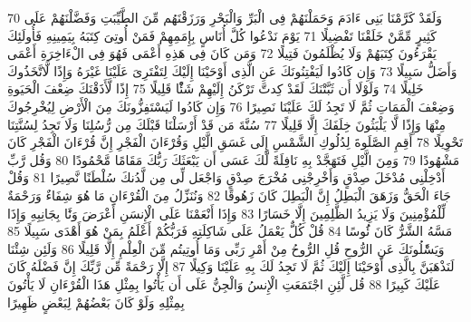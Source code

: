 \documentclass[20pt,a4paper]{article}
\begin{document}
{\tiny\colorbox{cl_aya}{70}} وَلَقَدْ كَرَّمْنَا بَنِى ءَادَمَ وَحَمَلْنَهُمْ فِى الْبَرِّ وَالْبَحْرِ وَرَزَقْنَهُم مِّنَ الطَّيِّبَتِ وَفَضَّلْنَهُمْ عَلَى كَثِيرٍ مِّمَّنْ خَلَقْنَا تَفْضِيلًا
{\tiny\colorbox{cl_aya}{71}} يَوْمَ نَدْعُوا كُلَّ أُنَاسٍ بِإِمَمِهِمْ فَمَنْ أُوتِىَ كِتَبَهُ بِيَمِينِهِ فَأُولَئِكَ يَقْرَءُونَ كِتَبَهُمْ وَلَا يُظْلَمُونَ فَتِيلًا
{\tiny\colorbox{cl_aya}{72}} وَمَن كَانَ فِى هَذِهِ أَعْمَى فَهُوَ فِى الْءَاخِرَةِ أَعْمَى وَأَضَلُّ سَبِيلًا
{\tiny\colorbox{cl_aya}{73}} وَإِن كَادُوا لَيَفْتِنُونَكَ عَنِ الَّذِى أَوْحَيْنَا إِلَيْكَ لِتَفْتَرِىَ عَلَيْنَا غَيْرَهُ وَإِذًا لَّاتَّخَذُوكَ خَلِيلًا
{\tiny\colorbox{cl_aya}{74}} وَلَوْلَا أَن ثَبَّتْنَكَ لَقَدْ كِدتَّ تَرْكَنُ إِلَيْهِمْ شَئًْا قَلِيلًا
{\tiny\colorbox{cl_aya}{75}} إِذًا لَّأَذَقْنَكَ ضِعْفَ الْحَيَوةِ وَضِعْفَ الْمَمَاتِ ثُمَّ لَا تَجِدُ لَكَ عَلَيْنَا نَصِيرًا
{\tiny\colorbox{cl_aya}{76}} وَإِن كَادُوا لَيَسْتَفِزُّونَكَ مِنَ الْأَرْضِ لِيُخْرِجُوكَ مِنْهَا وَإِذًا لَّا يَلْبَثُونَ خِلَفَكَ إِلَّا قَلِيلًا
{\tiny\colorbox{cl_aya}{77}} سُنَّةَ مَن قَدْ أَرْسَلْنَا قَبْلَكَ مِن رُّسُلِنَا وَلَا تَجِدُ لِسُنَّتِنَا تَحْوِيلًا
{\tiny\colorbox{cl_aya}{78}} أَقِمِ الصَّلَوةَ لِدُلُوكِ الشَّمْسِ إِلَى غَسَقِ الَّيْلِ وَقُرْءَانَ الْفَجْرِ إِنَّ قُرْءَانَ الْفَجْرِ كَانَ مَشْهُودًا
{\tiny\colorbox{cl_aya}{79}} وَمِنَ الَّيْلِ فَتَهَجَّدْ بِهِ نَافِلَةً لَّكَ عَسَى أَن يَبْعَثَكَ رَبُّكَ مَقَامًا مَّحْمُودًا
{\tiny\colorbox{cl_aya}{80}} وَقُل رَّبِّ أَدْخِلْنِى مُدْخَلَ صِدْقٍ وَأَخْرِجْنِى مُخْرَجَ صِدْقٍ وَاجْعَل لِّى مِن لَّدُنكَ سُلْطَنًا نَّصِيرًا
{\tiny\colorbox{cl_aya}{81}} وَقُلْ جَاءَ الْحَقُّ وَزَهَقَ الْبَطِلُ إِنَّ الْبَطِلَ كَانَ زَهُوقًا
{\tiny\colorbox{cl_aya}{82}} وَنُنَزِّلُ مِنَ الْقُرْءَانِ مَا هُوَ شِفَاءٌ وَرَحْمَةٌ لِّلْمُؤْمِنِينَ وَلَا يَزِيدُ الظَّلِمِينَ إِلَّا خَسَارًا
{\tiny\colorbox{cl_aya}{83}} وَإِذَا أَنْعَمْنَا عَلَى الْإِنسَنِ أَعْرَضَ وَنََٔا بِجَانِبِهِ وَإِذَا مَسَّهُ الشَّرُّ كَانَ ئَُوسًا
{\tiny\colorbox{cl_aya}{84}} قُلْ كُلٌّ يَعْمَلُ عَلَى شَاكِلَتِهِ فَرَبُّكُمْ أَعْلَمُ بِمَنْ هُوَ أَهْدَى سَبِيلًا
{\tiny\colorbox{cl_aya}{85}} وَيَسَْٔلُونَكَ عَنِ الرُّوحِ قُلِ الرُّوحُ مِنْ أَمْرِ رَبِّى وَمَا أُوتِيتُم مِّنَ الْعِلْمِ إِلَّا قَلِيلًا
{\tiny\colorbox{cl_aya}{86}} وَلَئِن شِئْنَا لَنَذْهَبَنَّ بِالَّذِى أَوْحَيْنَا إِلَيْكَ ثُمَّ لَا تَجِدُ لَكَ بِهِ عَلَيْنَا وَكِيلًا
{\tiny\colorbox{cl_aya}{87}} إِلَّا رَحْمَةً مِّن رَّبِّكَ إِنَّ فَضْلَهُ كَانَ عَلَيْكَ كَبِيرًا
{\tiny\colorbox{cl_aya}{88}} قُل لَّئِنِ اجْتَمَعَتِ الْإِنسُ وَالْجِنُّ عَلَى أَن يَأْتُوا بِمِثْلِ هَذَا الْقُرْءَانِ لَا يَأْتُونَ بِمِثْلِهِ وَلَوْ كَانَ بَعْضُهُمْ لِبَعْضٍ ظَهِيرًا
\end{document}
